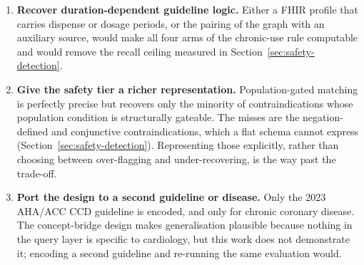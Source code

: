 \begin{enumerate}
    \item \textbf{Recover duration-dependent guideline logic.} Either a FHIR profile that
    carries dispense or dosage periods, or the pairing of the graph with an auxiliary
    source, would make all four arms of the chronic-use rule computable and would remove the
    recall ceiling measured in Section~\ref{sec:safety-detection}.

    \item \textbf{Give the safety tier a richer representation.} Population-gated matching is perfectly precise but recovers only the minority of
    contraindications whose population condition is structurally gateable. The misses are
    the negation-defined and conjunctive contraindications, which a flat schema cannot
    express (Section~\ref{sec:safety-detection}). Representing those explicitly, rather than
    choosing between over-flagging and under-recovering, is the way past the trade-off.

    \item \textbf{Port the design to a second guideline or disease.} Only the 2023 AHA/ACC
    CCD guideline is encoded, and only for chronic coronary disease. The concept-bridge
    design makes generalisation plausible because nothing in the query layer is specific to
    cardiology, but this work does not demonstrate it; encoding a second guideline and
    re-running the same evaluation would.
\end{enumerate}
